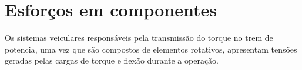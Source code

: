 %
%
%

\section{Esforços em componentes}


Os sistemas veiculares responsáveis pela transmissão do torque no trem de potencia, uma vez que são compostos de elementos rotativos, apresentam tensões geradas pelas cargas de torque e flexão durante a operação.


